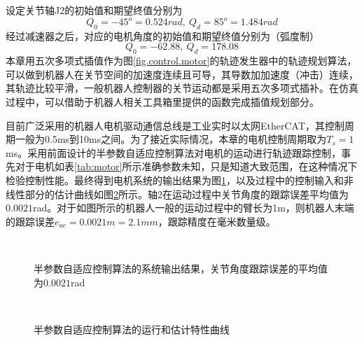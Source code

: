 设定关节轴J2的初始值和期望终值分别为
$$Q_{0}=-45^{o}=0.524rad,\ Q_{d}=85^{o}=1.484rad$$
经过减速器之后，对应的电机角度的初始值和期望终值分别为（弧度制）
$$Q_{0}=-62.88,\ Q_{d}=178.08$$
本章用五次多项式插值作为图\ref{fig.control.motor}的轨迹发生器中的轨迹规划算法，可以做到机器人在关节空间的加速度连续且可导，其导数加加速度（冲击）连续，其轨迹比较平滑，一般机器人控制器的关节运动都是采用五次多项式插补。在仿真过程中，可以借助于机器人相关工具箱里提供的函数完成插值规划部分。

目前广泛采用的机器人电机驱动通信总线是工业实时以太网EtherCAT，其控制周期一般为0.5ms到10ms之间。为了接近实际情况，本章的电机控制周期取为$T_{s}=1$ms。采用前面设计的半参数自适应控制算法对电机的运动进行轨迹跟踪控制，事先对于电机如表\ref{tab:motor}所示准确参数未知，只是知道大致范围，在这种情况下检验控制性能。最终得到电机系统的输出结果为图\ref{fig.sim.semi.yye}，以及过程中的控制输入和非线性部分的估计曲线如图\ref{fig.sim.semi.a}所示。轴2在运动过程中关节角度的跟踪误差平均值为$0.0021$rad。对于如图所示的机器人一般的运动过程中的臂长为1m，则机器人末端的跟踪误差$e_{ac}=0.0021m=2.1mm$，跟踪精度在毫米数量级。

\begin{figure}[!htb]
	\centering
	\\
	\caption{半参数自适应控制算法的系统输出结果，关节角度跟踪误差的平均值为$0.0021$rad}
	\label{fig.sim.semi.yye}
\end{figure}

\begin{figure}[!htb]
	\centering
	\\
	\caption{半参数自适应控制算法的运行和估计特性曲线}
	\label{fig.sim.semi.a}
\end{figure}

